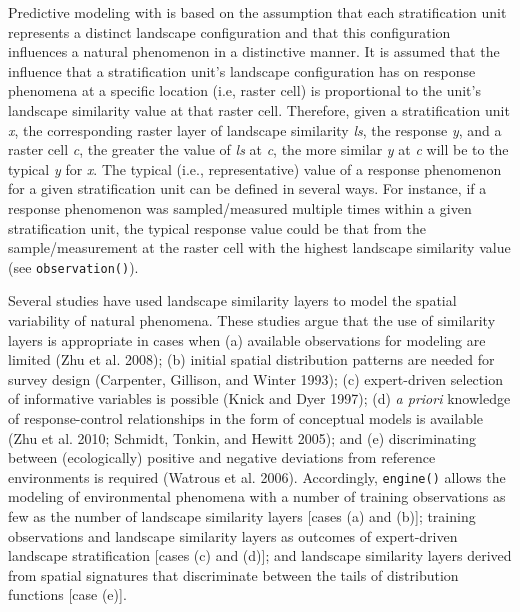 Predictive modeling with  is based on the assumption that each
stratification unit represents a distinct landscape configuration and that this
configuration influences a natural phenomenon in a distinctive manner. It is
assumed that the influence that a stratification unit's landscape configuration
has on response phenomena at a specific location (i.e, raster cell) is
proportional to the unit's landscape similarity value at that raster cell.
Therefore, given a stratification unit \emph{x}, the corresponding raster layer of
landscape similarity \emph{ls}, the response \emph{y}, and a raster cell \emph{c}, the greater
the value of \emph{ls} at \emph{c}, the more similar \emph{y} at \emph{c} will be to the typical \emph{y}
for \emph{x}. The typical (i.e., representative) value of a response phenomenon for a
given stratification unit can be defined in several ways. For instance, if a
response phenomenon was sampled/measured multiple times within a given
stratification unit, the typical response value could be that from the
sample/measurement at the raster cell with the highest landscape similarity
value (see \texttt{observation()}).

Several studies have used landscape similarity layers to model the spatial
variability of natural phenomena. These studies argue that the use of similarity
layers is appropriate in cases when (a) available observations for modeling are
limited (Zhu et al. 2008); (b) initial spatial distribution patterns are needed for
survey design (Carpenter, Gillison, and Winter 1993); (c) expert-driven selection of informative
variables is possible (Knick and Dyer 1997); (d) \emph{a priori} knowledge of response-control
relationships in the form of conceptual models is available (Zhu et al. 2010; Schmidt, Tonkin, and Hewitt 2005); and (e) discriminating between (ecologically) positive and
negative deviations from reference environments is required (Watrous et al. 2006).
Accordingly, \texttt{engine()} allows the modeling of environmental phenomena with a
number of training observations as few as the number of landscape similarity
layers {[}cases (a) and (b){]}; training observations and landscape similarity
layers as outcomes of expert-driven landscape stratification {[}cases (c) and
(d){]}; and landscape similarity layers derived from spatial signatures that
discriminate between the tails of distribution functions {[}case (e){]}.

